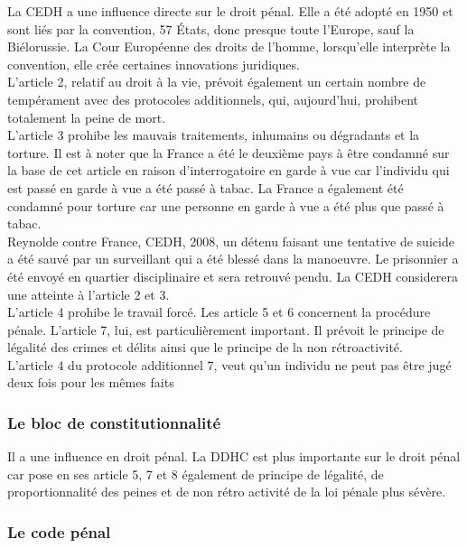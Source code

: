 \documentclass[10pt, a4paper, openany]{book}
\begin{document}
La CEDH a une influence directe sur le droit pénal. Elle a été adopté en 1950 et sont liés par la convention, 57 États, donc presque toute l'Europe, sauf la Biélorussie. La Cour Européenne des droits de l'homme, lorsqu'elle interprète la convention, elle crée certaines innovations juridiques. \\
L'article 2, relatif au droit à la vie, prévoit également un certain nombre de tempérament avec des protocoles additionnels, qui, aujourd'hui, prohibent totalement la peine de mort. \\
L'article 3 prohibe les mauvais traitements, inhumains ou dégradants et la torture. Il est à noter que la France a été le deuxième pays à être condamné sur la base de cet article en raison d'interrogatoire en garde à vue car l'individu qui est passé en garde à vue a été passé à tabac. La France a également été condamné pour torture car une personne en garde à vue a été plus que passé à tabac. \\
Reynolde contre France, CEDH, 2008, un détenu faisant une tentative de suicide a été sauvé par un surveillant qui a été blessé dans la manoeuvre. Le prisonnier a été envoyé en quartier disciplinaire et sera retrouvé pendu. La CEDH considerera une atteinte à l'article 2 et 3. \\
L'article 4 prohibe le travail forcé. Les article 5 et 6 concernent la procédure pénale. L'article 7, lui, est particulièrement important. Il prévoit le principe de légalité des crimes et délits ainsi que le principe de la non rétroactivité. \\
L'article 4 du protocole additionnel 7, veut qu'un individu ne peut pas être jugé deux fois pour les mêmes faits

\subsubsection{Le bloc de constitutionnalité}

Il a une influence en droit pénal. La DDHC est plus importante sur le droit pénal car pose en ses article 5, 7 et 8 également de principe de légalité, de proportionnalité des peines et de non rétro activité de la loi pénale plus sévère.

\subsubsection{Le code pénal}
\end{document}
